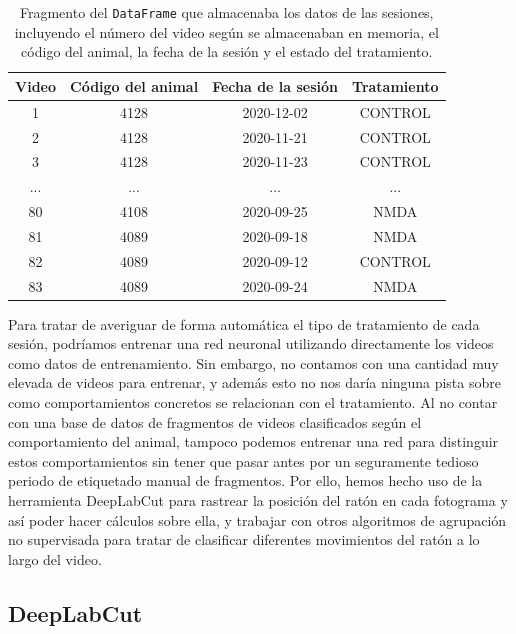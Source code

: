 \begin{table}[h]
  \centering
  \begin{tabular}{|c|c|c|c|}
    \hline
    \textbf{Video} & \textbf{Código del animal} & \textbf{Fecha de la sesión} & \textbf{Tratamiento} \\ 
    \hline
    1 & 4128	& 2020-12-02	& CONTROL \\ 	
    2 & 4128	& 2020-11-21	& CONTROL \\ 	
    3 & 4128	& 2020-11-23	& CONTROL \\ 
    ... &  ...	& ... & ... \\ 
    80 & 4108	& 2020-09-25	& NMDA	\\ 
    81 & 4089	& 2020-09-18	& NMDA	\\
    82 & 4089	& 2020-09-12	& CONTROL	\\ 
    83 & 4089	& 2020-09-24	& NMDA	\\
    \hline
  \end{tabular}
  \caption[Datos de las sesiones]{Fragmento del \texttt{DataFrame} que almacenaba los datos de las sesiones, incluyendo el número del video según se almacenaban en memoria, el código del animal, la fecha de la sesión y el estado del tratamiento.}
  \label{tab:animal-info}
\end{table}

Para tratar de averiguar de forma automática el tipo de tratamiento de cada sesión, podríamos entrenar una red neuronal utilizando directamente los videos como datos de entrenamiento. Sin embargo, no contamos con una cantidad muy elevada de videos para entrenar, y además esto no nos daría ninguna pista sobre como comportamientos concretos se relacionan con el tratamiento. Al no contar con una base de datos de fragmentos de videos clasificados según el comportamiento del animal, tampoco podemos entrenar una red para distinguir estos comportamientos sin tener que pasar antes por un seguramente tedioso periodo de etiquetado manual de fragmentos. Por ello, hemos hecho uso de la herramienta DeepLabCut para rastrear la posición del ratón en cada fotograma y así poder hacer cálculos sobre ella, y trabajar con otros algoritmos de agrupación no supervisada para tratar de clasificar diferentes movimientos del ratón a lo largo del video.

\subsection{DeepLabCut}\label{sec:DeepLabCut}


